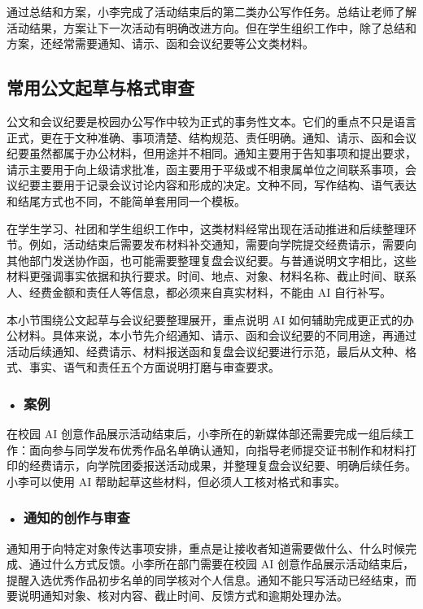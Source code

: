 通过总结和方案，小李完成了活动结束后的第二类办公写作任务。总结让老师了解活动结果，方案让下一次活动有明确改进方向。但在学生组织工作中，除了总结和方案，还经常需要通知、请示、函和会议纪要等公文类材料。


\subsection{常用公文起草与格式审查}

公文和会议纪要是校园办公写作中较为正式的事务性文本。它们的重点不只是语言正式，更在于文种准确、事项清楚、结构规范、责任明确。通知、请示、函和会议纪要虽然都属于办公材料，但用途并不相同。通知主要用于告知事项和提出要求，请示主要用于向上级请求批准，函主要用于平级或不相隶属单位之间联系事项，会议纪要主要用于记录会议讨论内容和形成的决定。文种不同，写作结构、语气表达和结尾方式也不同，不能简单套用同一个模板。

在学生学习、社团和学生组织工作中，这类材料经常出现在活动推进和后续整理环节。例如，活动结束后需要发布材料补交通知，需要向学院提交经费请示，需要向其他部门发送协作函，也可能需要整理复盘会议纪要。与普通说明文字相比，这些材料更强调事实依据和执行要求。时间、地点、对象、材料名称、截止时间、联系人、经费金额和责任人等信息，都必须来自真实材料，不能由 AI 自行补写。

本小节围绕公文起草与会议纪要整理展开，重点说明 AI 如何辅助完成更正式的办公材料。具体来说，本小节先介绍通知、请示、函和会议纪要的不同用途，再通过活动后续通知、经费请示、材料报送函和复盘会议纪要进行示范，最后从文种、格式、事实、语气和责任五个方面说明打磨与审查要求。

\subsubsection*{\textbf{• 案例}}

在校园 AI 创意作品展示活动结束后，小李所在的新媒体部还需要完成一组后续工作：面向参与同学发布优秀作品名单确认通知，向指导老师提交证书制作和材料打印的经费请示，向学院团委报送活动成果，并整理复盘会议纪要、明确后续任务。小李可以使用 AI 帮助起草这些材料，但必须人工核对格式和事实。

\subsubsection*{\textbf{• 通知的创作与审查}}

通知用于向特定对象传达事项安排，重点是让接收者知道需要做什么、什么时候完成、通过什么方式反馈。小李所在部门需要在校园 AI 创意作品展示活动结束后，提醒入选优秀作品初步名单的同学核对个人信息。通知不能只写活动已经结束，而要说明通知对象、核对内容、截止时间、反馈方式和逾期处理办法。

